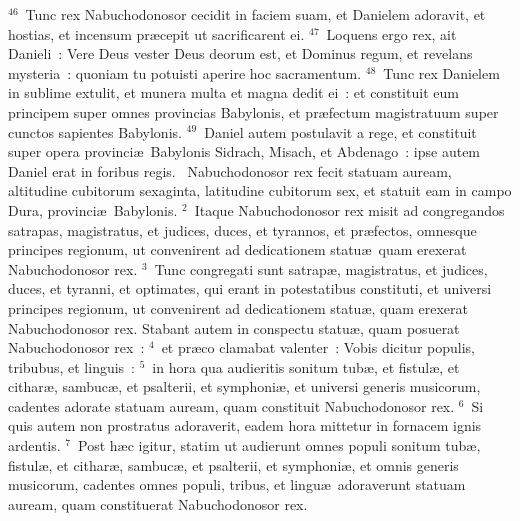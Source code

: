 ${}^{46}$~Tunc rex Nabuchodonosor cecidit in faciem suam, et Danielem adoravit, et hostias, et incensum pr\ae cepit ut sacrificarent ei.
${}^{47}$~Loquens ergo rex, ait Danieli~: Vere Deus vester Deus deorum est, et Dominus regum, et revelans mysteria~: quoniam tu potuisti aperire hoc sacramentum.
${}^{48}$~Tunc rex Danielem in sublime extulit, et munera multa et magna dedit ei~: et constituit eum principem super omnes provincias Babylonis, et pr\ae fectum magistratuum super cunctos sapientes Babylonis.
${}^{49}$~Daniel autem postulavit a rege, et constituit super opera provinci\ae\ Babylonis Sidrach, Misach, et Abdenago~: ipse autem Daniel erat in foribus regis.
~\lettrine[lines=10,image=true,loversize=0.05,lraise=-0.03]{N}{}abuchodonosor rex fecit statuam auream, altitudine cubitorum sexaginta, latitudine cubitorum sex, et statuit eam in campo Dura, provinci\ae\ Babylonis.
${}^{2}$~Itaque Nabuchodonosor rex misit ad congregandos satrapas, magistratus, et judices, duces, et tyrannos, et pr\ae fectos, omnesque principes regionum, ut convenirent ad dedicationem statu\ae\ quam erexerat Nabuchodonosor rex.
${}^{3}$~Tunc congregati sunt satrap\ae , magistratus, et judices, duces, et tyranni, et optimates, qui erant in potestatibus constituti, et universi principes regionum, ut convenirent ad dedicationem statu\ae , quam erexerat Nabuchodonosor rex. Stabant autem in conspectu statu\ae , quam posuerat Nabuchodonosor rex~:
${}^{4}$~et pr\ae co clamabat valenter~: Vobis dicitur populis, tribubus, et linguis~:
${}^{5}$~in hora qua audieritis sonitum tub\ae , et fistul\ae , et cithar\ae , sambuc\ae , et psalterii, et symphoni\ae , et universi generis musicorum, cadentes adorate statuam auream, quam constituit Nabuchodonosor rex.
${}^{6}$~Si quis autem non prostratus adoraverit, eadem hora mittetur in fornacem ignis ardentis.
${}^{7}$~Post h\ae c igitur, statim ut audierunt omnes populi sonitum tub\ae , fistul\ae , et cithar\ae , sambuc\ae , et psalterii, et symphoni\ae , et omnis generis musicorum, cadentes omnes populi, tribus, et lingu\ae\ adoraverunt statuam auream, quam constituerat Nabuchodonosor rex.


